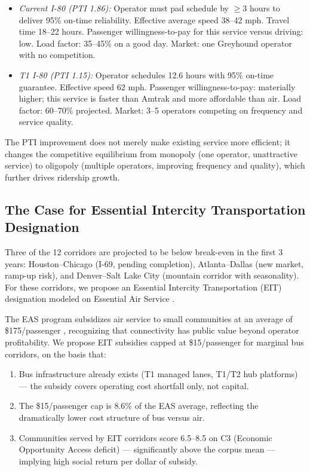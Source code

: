 \begin{itemize}
  \item \emph{Current I-80 (PTI 1.86):} Operator must pad schedule by $\geq$3 hours to deliver 95\% on-time reliability. Effective average speed 38--42 mph. Travel time 18--22 hours. Passenger willingness-to-pay for this service versus driving: low. Load factor: 35--45\% on a good day. Market: one Greyhound operator with no competition.

  \item \emph{T1 I-80 (PTI 1.15):} Operator schedules 12.6 hours with 95\% on-time guarantee. Effective speed 62 mph. Passenger willingness-to-pay: materially higher; this service is faster than Amtrak and more affordable than air. Load factor: 60--70\% projected. Market: 3--5 operators competing on frequency and service quality.
\end{itemize}

The PTI improvement does not merely make existing service more efficient; it changes the competitive equilibrium from monopoly (one operator, unattractive service) to oligopoly (multiple operators, improving frequency and quality), which further drives ridership growth.

\subsection{The Case for Essential Intercity Transportation Designation}

Three of the 12 corridors are projected to be below break-even in the first 3 years: Houston--Chicago (I-69, pending completion), Atlanta--Dallas (new market, ramp-up risk), and Denver--Salt Lake City (mountain corridor with seasonality). For these corridors, we propose an Essential Intercity Transportation (EIT) designation modeled on Essential Air Service \citep{EAS_DOT2023}.

The EAS program subsidizes air service to small communities at an average of \$175/passenger \citep{EAS_DOT2023}, recognizing that connectivity has public value beyond operator profitability. We propose EIT subsidies capped at \$15/passenger for marginal bus corridors, on the basis that:
\begin{enumerate}
  \item Bus infrastructure already exists (T1 managed lanes, T1/T2 hub platforms) --- the subsidy covers operating cost shortfall only, not capital.
  \item The \$15/passenger cap is 8.6\% of the EAS average, reflecting the dramatically lower cost structure of bus versus air.
  \item Communities served by EIT corridors score 6.5--8.5 on C3 (Economic Opportunity Access deficit) --- significantly above the corpus mean --- implying high social return per dollar of subsidy.
\end{enumerate}

